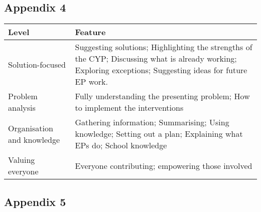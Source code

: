 \documentclass[
]{article}
\begin{document}
\hypertarget{appendix-4}{%
\subsection{Appendix 4}\label{appendix-4}}

\begin{longtable}[]{@{}
  >{\raggedright\arraybackslash}p{}
  >{\raggedright\arraybackslash}p{}@{}}
\toprule
Level & Feature \\
\midrule
\endhead
Solution-focused & Suggesting solutions; Highlighting the strengths of
the CYP; Discussing what is already working; Exploring exceptions;
Suggesting ideas for future EP work. \\
Problem analysis & Fully understanding the presenting problem; How to
implement the interventions \\
Organisation and knowledge & Gathering information; Summarising; Using
knowledge; Setting out a plan; Explaining what EPs do; School
knowledge \\
Valuing everyone & Everyone contributing; empowering those involved \\
\bottomrule
\end{longtable}

\hypertarget{appendix-5}{%
\subsection{Appendix 5}\label{appendix-5}}
\end{document}
